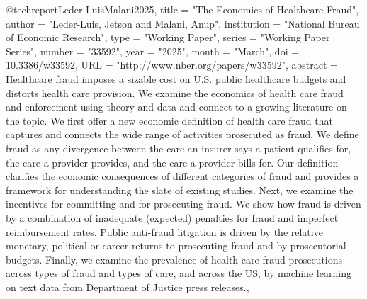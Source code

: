 @techreport{Leder-LuisMalani2025,
 title = "The Economics of Healthcare Fraud",
 author = "Leder-Luis, Jetson and Malani, Anup",
 institution = "National Bureau of Economic Research",
 type = "Working Paper",
 series = "Working Paper Series",
 number = "33592",
 year = "2025",
 month = "March",
 doi = {10.3386/w33592},
 URL = "http://www.nber.org/papers/w33592",
 abstract = {Healthcare fraud imposes a sizable cost on U.S. public healthcare budgets and distorts health care provision. We examine the economics of health care fraud and enforcement using theory and data and connect to a growing literature on the topic. We first offer a new economic definition of health care fraud that captures and connects the wide range of activities prosecuted as fraud. We define fraud as any divergence between the care an insurer says a patient qualifies for, the care a provider provides, and the care a provider bills for. Our definition clarifies the economic consequences of different categories of fraud and provides a framework for understanding the slate of existing studies. Next, we examine the incentives for committing and for prosecuting fraud. We show how fraud is driven by a combination of inadequate (expected) penalties for fraud and imperfect reimbursement rates. Public anti-fraud litigation is driven by the relative monetary, political or career returns to prosecuting fraud and by prosecutorial budgets. Finally, we examine the prevalence of health care fraud prosecutions across types of fraud and types of care, and across the US, by machine learning on text data from Department of Justice press releases.},
}



